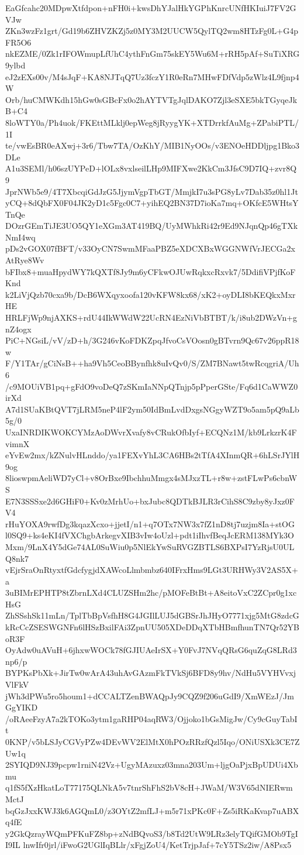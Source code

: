 EaGfcahc20MDpwXtfdpon+nFH0i+kwsDhYJalHkYGPhKnrcUNfHKIuiJ7FV2GVJw
ZKn3wzFz1grt/Gd19b6ZHVZKZj5z0MY3M2UUCW5QylTQ2wm8HTzFg0L+G4pFR5O6
nkEZME/0Zk1rIFOWmupLfUhC4ythFnGm75skEY5Wu6M+rRH5pAf+SuTiXRG9ylbd
eJ2zEXs00v/M4sJqF+KA8NJTqQ7Uz3fczY1R0eRn7MHwFDfVdp5zWlz4L9fjnp4W
Orb/huCMWKdh15hGw0sGBcFx0o2hAYTVTgJqlDAKO7Zjl3eSXE5bkTGyqeJkB+C4
8loWTY0a/Ph4uok/FKEttMLklj0epWeg8jRyygYK+XTDrrkfAuMg+ZPabiPTL/1I
te/vwEsBR0eAXwj+3r6/Tbw7TA/OzKhY/MIB1NyOOs/v3ENOeHDDljpg1Bko3DLe
A1u3SEMl/h06szUYPeD+lOLx8vxlseilLHp9MIFXwe2KkCm3JfsC9D7IQ+zvr8Q9
JprNWb5e9/4T7XbcqiGdJzG5JjymVgpTbGT/MmjkI7u3sPG8yLv7Dab35z0hl1Jt
yCQ+8dQbFX0F04JK2yD1c5Fgc0C7+yihEQ2BN37D7ioKa7mq+OKfcE5WHtsYTnQe
DOzrGEmTiJE3UO5QY1eXGm3AT419BQ/UyMWhkRi42r9Ed9NJqnQp46gTXkNmI4wq
pDs2vGOX07fBFT/v33OyCN7SwmMFaaPBZ5eXDCXBxWGGNWfVrJECGa2xAtRye8Wv
bFIbx8+muaHpydWY7kQXTf8Jy9m6yCFkwOJUwRqkxcRxvk7/5DdifiVPjfKoFKnd
k2LiVjQzb70cxa9b/DcB6WXqyxoofa120vKFW8kx68/xK2+oyDLI8bKEQkxMxrHE
HRLFjWp9njAXKS+rdU44IkWWdW22UcRN4EzNiVbBTBT/k/i8ub2DWzVn+gnZ4ogx
PiC+NGsiL/vV/zD+h/3G246vKoFDKZpqJfvoCsVOosn0gBTvrn9Qc67v26ppR18w
F/Y1TAr/gCiNsB++ha9Vh5CeoBBynfhk8uIvQv0/S/ZM7BNawt5twRcqgriA/Uh6
/c9MOUiVB1pq+gFdO9voDeQ7zSKmIaNNpQTnjp5pPperGSte/Fq6d1CaWWZ0irXd
A7d1SUaKBtQVT7jLRM5neP4lF2ym50IdBmLvdDxgsNGgyWZT9o5am5pQ9aLb5g/0
UxaINRDIKWOKCYMzAoDWvrXvafy8vCRukOfbIyf+ECQNz1M/kb9LrkzrK4FvimnX
eYvEw2mx/kZNulvHLnddo/ya1FEXvYhL3CA6HBs2tTfA4XInmQR+6hLSrJYlH9og
8lioswpmAeliWD7yCl+v8OrBxe9IbchhuMmgx4sMJxzTL+r8w+zstFLwPs6cbnWS
E7N3SSSxe2d6GHiF0+Kv0zMrhUo+bxJubc8QDTkBJLR3rCihS8C9zby8yJxz0FV4
rHuYOXA9rwfDg3kqazXcxo+jjetI/n1+q7OTx7NW3x7fZ1nD8tj7uzjm8Ia+stOG
l0SQ9+ks4eKI4fVXChgbArkegvXIB3vIw4oUzl+pdt1iIhvfBeqJcERM138MYk3O
Mxm/9LnX4Y5dGe74AL0SuWiu0p5NlEkYwSuRVGZBTLS6BXPsI7YzRjsU0ULQ8nk7
vEjrSraOnRtyxtfGdcfygjdXAWcoLlmbmbz640IFrxHms9LGt3URHWy3V2AS5X+a
3uBIMrEPHTP8tZbrnLXd4CLUZSHm2hc/pMOFeBtBt+A8eitoVxC2ZCpr0g1xcHsG
ZhSSshSk11mLn/TplTbBpVsfhH8G4JGIlLUJ5dGBSrJhJHyO7771xjg5MtG8zdcG
kRcCcZSESWGNFn6lHSzBxilFAi3ZpnUU505XDeDDqXTbHBmfhunTN7Qr52YBoR3F
OyAdw0uAVuH+6jhxwWOCk78fGJIUAeIrSX+Y0FvJ7NVqQRsG6quZqG8LRd3np6/p
BYPKsPbXk+JirTw0wArA43uhAvGAzmFkTVkSj6BFD8y9hv/NdHu5VYHVvxjVlFkV
jWh3dPWu5ro5houm1+dCCALTZenBWAQpJy9CQZ9f206uGdI9/XmWEzJ/JmGgYIKD
/oRAeeFzyA7a2kTOKo3ytm1gaRHP04aqRW3/Ojjoko1bGsMigJw/Cy9cGuyTabIt
0KNP/v5bLSJyCGVyPZw4DEvWV2ElMtX0hPOzRRzfQzl5Iqo/ONiUSXk3CE7ZUw1q
2SYIQD9NJ39pcpw1rniN42Vz+UgyMAzuxz03mna203Um+ljgOaPjxBpUDUi4Xbmu
q1fS5fXzHkatLoT77175QLNkA5v7tnrShFhS2bV8cH+JWaM/W3V65dNIERwmMctJ
bqGzJxxKWJ3k6AGQmL0/z3OYtZ2mfLJ+m5r71xPKc0F+Zs5iRKaKvap7uABXq4fE
y2GkQzrayWQmPFKuFZ8bp+zNdBQvoS3/b8Td2UtW9LRz3elyTQifGMOb9TgII9IL
lnwIfr0jrl/iFwoG2UGlIqBLlr/xFgjZoU4/KetTrjpJaf+7cY5TSz2iw/A8Psx5
